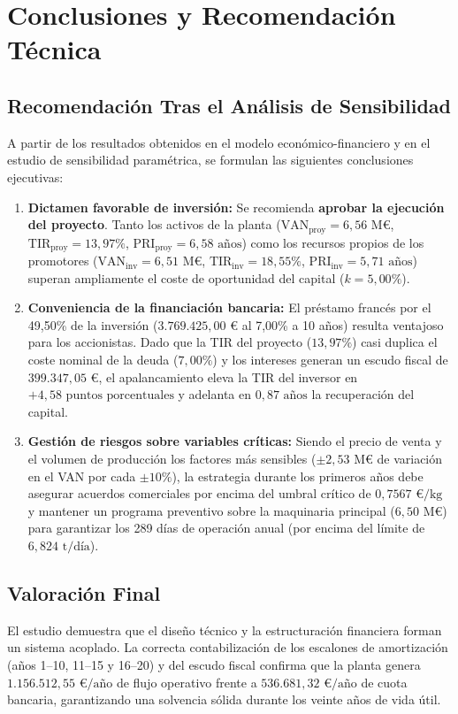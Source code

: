 \documentclass[a4paper,11pt]{report}
\providecommand{\euro}{€}
\begin{document}
\chapter{Conclusiones y Recomendación Técnica}

\section{Recomendación Tras el Análisis de Sensibilidad}
A partir de los resultados obtenidos en el modelo económico-financiero y en el estudio de sensibilidad paramétrica, se formulan las siguientes conclusiones ejecutivas:
\begin{enumerate}
    \item \textbf{Dictamen favorable de inversión:} Se recomienda \textbf{aprobar la ejecución del proyecto}. Tanto los activos de la planta ($\text{VAN}_{\text{proy}} = 6,56\text{ M\euro}$, $\text{TIR}_{\text{proy}} = 13,97\%$, $\text{PRI}_{\text{proy}} = 6,58\text{ años}$) como los recursos propios de los promotores ($\text{VAN}_{\text{inv}} = 6,51\text{ M\euro}$, $\text{TIR}_{\text{inv}} = 18,55\%$, $\text{PRI}_{\text{inv}} = 5,71\text{ años}$) superan ampliamente el coste de oportunidad del capital ($k = 5,00\%$).
    \item \textbf{Conveniencia de la financiación bancaria:} El préstamo francés por el 49,50\% de la inversión ($3.769.425,00\text{ \euro}$ al 7,00\% a 10 años) resulta ventajoso para los accionistas. Dado que la TIR del proyecto ($13,97\%$) casi duplica el coste nominal de la deuda ($7,00\%$) y los intereses generan un escudo fiscal de $399.347,05\text{ \euro}$, el apalancamiento eleva la TIR del inversor en $+4,58\text{ puntos porcentuales}$ y adelanta en $0,87\text{ años}$ la recuperación del capital.
    \item \textbf{Gestión de riesgos sobre variables críticas:} Siendo el precio de venta y el volumen de producción los factores más sensibles ($\pm 2,53\text{ M\euro}$ de variación en el VAN por cada $\pm 10\%$), la estrategia durante los primeros años debe asegurar acuerdos comerciales por encima del umbral crítico de $0,7567\text{ \euro/kg}$ y mantener un programa preventivo sobre la maquinaria principal ($6,50\text{ M\euro}$) para garantizar los 289 días de operación anual (por encima del límite de $6,824\text{ t/día}$).
\end{enumerate}

\section{Valoración Final}
El estudio demuestra que el diseño técnico y la estructuración financiera forman un sistema acoplado. La correcta contabilización de los escalones de amortización (años 1--10, 11--15 y 16--20) y del escudo fiscal confirma que la planta genera $1.156.512,55\text{ \euro/año}$ de flujo operativo frente a $536.681,32\text{ \euro/año}$ de cuota bancaria, garantizando una solvencia sólida durante los veinte años de vida útil.
\end{document}
